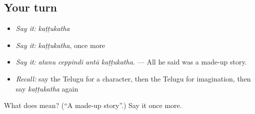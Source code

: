 \subsection*{Your turn}
\begin{itemize}
\raggedright
  \item \emph{Say it:} \emph{kaṭṭukatha}
  \item \emph{Say it:} \emph{kaṭṭukatha}, once more
  \item \emph{Say it:} \emph{atanu ceppindi antā kaṭṭukatha.} — All he said was a made-up story.
  \item \emph{Recall:} say the Telugu for a character, then the Telugu for imagination, then say \emph{kaṭṭukatha} again
\end{itemize}

\begin{tcolorbox}[breakable,colback=teal!4,colframe=teal!35!black,title={Before you move on}]
What does  mean? (\textquotedblleft{}A made-up story\textquotedblright{}.) Say it once more.
\end{tcolorbox}
